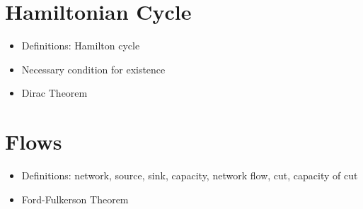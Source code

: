 \documentclass[a4paper]{article}
\begin{document}
\section{Hamiltonian Cycle}                                      
\begin{itemize}
    \item Definitions: Hamilton cycle
    \item Necessary condition for existence 
    \item Dirac Theorem
\end{itemize}


\section{Flows}                                                  
\begin{itemize}
    \item Definitions: network, source, sink, capacity, network flow, cut, 
    capacity of cut

    \item Ford-Fulkerson Theorem
\end{itemize}
                                                                 
\end{document}
